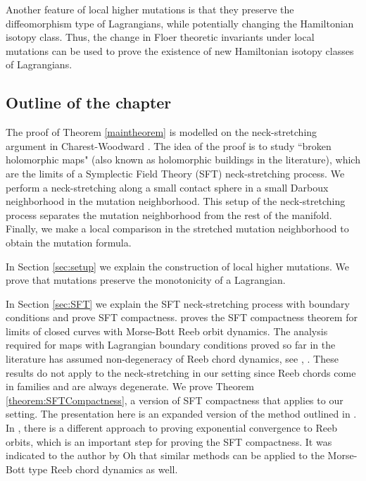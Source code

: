 Another feature of local higher mutations is that they preserve the diffeomorphism type of Lagrangians, while potentially changing the Hamiltonian isotopy class. Thus, the change in Floer theoretic invariants under local mutations can be used to prove the existence of new Hamiltonian isotopy classes of Lagrangians.   



 
 
\subsection{Outline of the chapter}

The proof of Theorem \ref{maintheorem} is modelled on the neck-stretching argument in Charest-Woodward \cite{floerflip}.  The idea of the proof is to study ``broken holomorphic maps" (also known as holomorphic buildings in the literature), which are the limits of a Symplectic Field Theory (SFT) neck-stretching process.  We perform a neck-stretching along a small contact sphere in a small Darboux neighborhood in the mutation neighborhood.  This setup of the neck-stretching process separates the mutation neighborhood from the rest of the manifold. Finally, we make a local comparison in the stretched mutation neighborhood to obtain the mutation formula.  

 In Section \ref{sec:setup} we explain the construction of local higher mutations. We prove that mutations preserve the monotonicity of a Lagrangian. 
 
 In Section \ref{sec:SFT} we explain the SFT neck-stretching process with boundary conditions and prove SFT compactness.   \cite{bhewz} proves the SFT compactness theorem for limits of closed curves with Morse-Bott Reeb orbit dynamics.  The analysis required for maps with Lagrangian boundary conditions proved so far in the literature has assumed non-degeneracy of Reeb chord dynamics,  see \cite{Abbasbook},  \cite{dylanexpconv}.  These results do not apply to the neck-stretching in our setting since Reeb chords come in families and are always degenerate.  We prove Theorem \ref{theorem:SFTCompactness},  a version of SFT compactness that applies to our setting.  The presentation here is an expanded version of the method outlined in \cite{palmerwoodwardsurg}.  In \cite{Oh-Wang2},  there is a different approach to proving exponential convergence to Reeb orbits, which is an important step for proving the SFT compactness.  It was indicated to the author by Oh that similar methods can be applied to the Morse-Bott type Reeb chord dynamics as well. 
 

